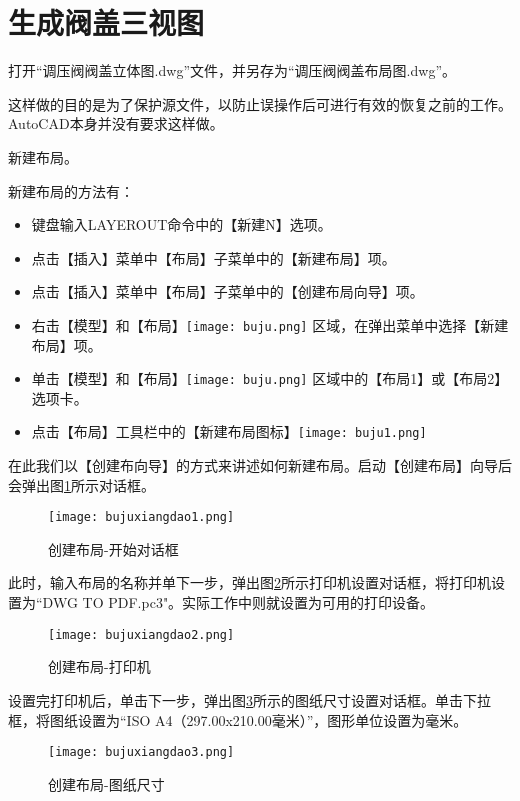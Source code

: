 \section{生成阀盖三视图}
\begin{procedure}
\item 打开“调压阀阀盖立体图.dwg”文件，并另存为“调压阀阀盖布局图.dwg”。

这样做的目的是为了保护源文件，以防止误操作后可进行有效的恢复之前的工作。AutoCAD本身并没有要求这样做。
\item 新建布局。

新建布局的方法有：
\begin{itemize}
\item 键盘输入LAYEROUT命令中的【新建N】选项。
\item 点击【插入】菜单中【布局】子菜单中的【新建布局】项。
\item 点击【插入】菜单中【布局】子菜单中的【创建布局向导】项。
\item 右击【模型】和【布局】\texttt{[image: buju.png]} 区域，在弹出菜单中选择【新建布局】项。
\item 单击【模型】和【布局】\texttt{[image: buju.png]} 区域中的【布局1】或【布局2】选项卡。
\item 点击【布局】工具栏中的【新建布局图标】\texttt{[image: buju1.png]}
\end{itemize}
在此我们以【创建布向导】的方式来讲述如何新建布局。启动【创建布局】向导后会弹出图\ref{fig:bujuxiangdao1}所示对话框。
\begin{figure}[htbp]
\centering
\texttt{[image: bujuxiangdao1.png]}
\caption{创建布局-开始对话框}\label{fig:bujuxiangdao1}
\end{figure}

此时，输入布局的名称并单下一步，弹出图\ref{fig:bujuxiangdao2}所示打印机设置对话框，将打印机设置为“DWG TO PDF.pc3"。实际工作中则就设置为可用的打印设备。
\begin{figure}[htbp]
\centering
\texttt{[image: bujuxiangdao2.png]}
\caption{创建布局-打印机}\label{fig:bujuxiangdao2}
\end{figure}

设置完打印机后，单击下一步，弹出图\ref{fig:bujuxiangdao3}所示的图纸尺寸设置对话框。单击下拉框，将图纸设置为“ISO A4（297.00x210.00毫米）”，图形单位设置为毫米。
\begin{figure}[htbp]
\centering
\texttt{[image: bujuxiangdao3.png]}
\caption{创建布局-图纸尺寸}\label{fig:bujuxiangdao3}
\end{figure}


\end{procedure}
